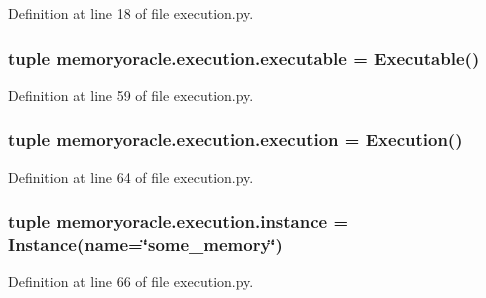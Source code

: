 Definition at line 18 of file execution.\+py.

\hypertarget{namespacememoryoracle_1_1execution_a4d764e8579bfe0d25924dfb6adcdd2ee}{}
\subsubsection[{executable}]{\setlength{\rightskip}{0pt plus 5cm}tuple memoryoracle.\+execution.\+executable = {\bf Executable}()}\label{namespacememoryoracle_1_1execution_a4d764e8579bfe0d25924dfb6adcdd2ee}


Definition at line 59 of file execution.\+py.

\hypertarget{namespacememoryoracle_1_1execution_af8598b45538c92785bbdcd27f9c5fdd5}{}
\subsubsection[{execution}]{\setlength{\rightskip}{0pt plus 5cm}tuple memoryoracle.\+execution.\+execution = {\bf Execution}()}\label{namespacememoryoracle_1_1execution_af8598b45538c92785bbdcd27f9c5fdd5}


Definition at line 64 of file execution.\+py.

\hypertarget{namespacememoryoracle_1_1execution_a53a733d87e07c06eaa39fd870dc12cc7}{}
\subsubsection[{instance}]{\setlength{\rightskip}{0pt plus 5cm}tuple memoryoracle.\+execution.\+instance = {\bf Instance}(name=\char`\"{}some\+\_\+memory\char`\"{})}\label{namespacememoryoracle_1_1execution_a53a733d87e07c06eaa39fd870dc12cc7}


Definition at line 66 of file execution.\+py.

